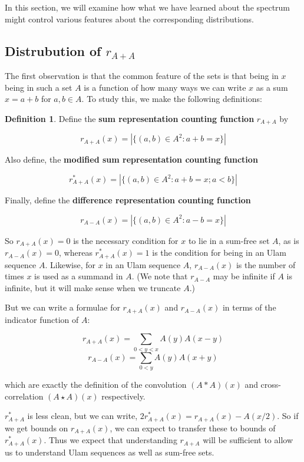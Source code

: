 \documentclass{article}
\theoremstyle{definition}
\newtheorem{definition}{Definition}
\theoremstyle{remark}
\numberwithin{equation}{section}
\begin{document}
In this section, we will examine how what we have learned about the
spectrum might control various features about the corresponding
distributions.

\subsection{Distrubution of $r_{A+A}$}

The first observation is that the common feature of the \relevant sets
is that being in $x$ being in such a set $A$ is a function of how many
ways we can write $x$ as a sum $x = a+b$ for $a, b \in A$.  To study
this, we make the following definitions: 

\begin{definition}Define the \textbf{sum representation counting function}
  $r_{A+A}$ by 

  \[r_{A+A}(x) = \left|\{(a,b) \in A^2 : a+b = x\}\right|\]

  Also define, the \textbf{modified sum representation counting function}

  \[r^*_{A+A}(x) = \left|\{(a,b) \in A^2 : a+b = x ; a < b\}\right|\]

  Finally, define the \textbf{difference representation counting
    function}

  \[r_{A-A}(x) = \left|\{(a,b) \in A^2 : a-b = x\}\right|\]
\end{definition} 

So $r_{A+A}(x) = 0$ is the necessary condition for $x$ to lie in a
sum-free set $A$, as is $r_{A-A}(x) = 0$, whereas $r^*_{A+A}(x) = 1$
is the condition for being in an Ulam sequence $A$.  Likewise, for $x$
in an Ulam sequence $A$, $r_{A-A}(x)$ is the number of times $x$ is
used as a summand in $A$.  (We note that $r_{A-A}$ may be infinite if
$A$ is infinite, but it will make sense when we truncate $A$.)

But we can write a formulae for $r_{A+A}(x)$ and $r_{A-A}(x)$ in terms
of the indicator function of $A$:

\[r_{A+A}(x) = \sum_{0 < y < x} A(y)A(x-y)\]
\[r_{A-A}(x) = \sum_{0 < y} A(y)A(x+y)\]

which are exactly the definition of the convolution $(A \ast A)(x)$
and cross-correlation $(A \star A)(x)$ respectively.

$r^*_{A+A}$ is less clean, but we can write,
$2r^*_{A+A}(x) = r_{A+A}(x) - A(x/2)$.  So if we get bounds on
$r_{A+A}(x)$, we can expect to transfer these to bounds of
$r^*_{A+A}(x)$.  Thus we expect that understanding $r_{A+A}$ will be
sufficient to allow us to understand Ulam sequences as well as
sum-free sets.
\end{document}
